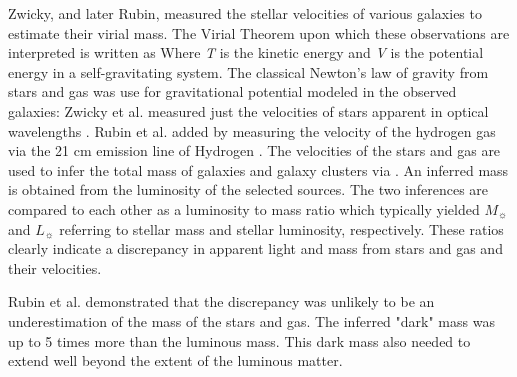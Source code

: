 Zwicky, and later Rubin, measured the stellar velocities of various galaxies to estimate their virial mass.
The Virial Theorem upon which these observations are interpreted is written as \virialtheorem
Where \textit{T} is the kinetic energy and \textit{V} is the potential energy in a self-gravitating system.
The classical Newton's law of gravity from stars and gas was use for gravitational potential modeled in the observed galaxies: \newtongravity
Zwicky et al. measured just the velocities of stars apparent in optical wavelengths \cite{Zwicky:1933}.
Rubin et al. added by measuring the velocity of the hydrogen gas via the 21 cm emission line of Hydrogen \cite{Rubin:1978}.
The velocities of the stars and gas are used to infer the total mass of galaxies and galaxy clusters via .
An inferred mass is obtained from the luminosity of the selected sources.
The two inferences are compared to each other as a luminosity to mass ratio which typically yielded \cite{Greene:cosmology_dm}\masslightratio
$M_{\sun}$ and $L_{\sun}$ referring to stellar mass and stellar luminosity, respectively.
These ratios clearly indicate a discrepancy in apparent light and mass from stars and gas and their velocities.

Rubin et al. \cite{Rubin:1978} demonstrated that the discrepancy was unlikely to be an underestimation of the mass of the stars and gas.
The inferred "dark" mass was up to 5 times more than the luminous mass.
This dark mass also needed to extend well beyond the extent of the luminous matter.

\begin{figure}[h]
\end{figure}

